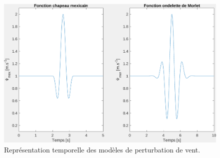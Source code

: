 \begin{figure}[ht!]
    \centerline{
    \includegraphics[trim=0cm 0cm 0cm 0cm,clip,width=0.9\columnwidth]{figures/mex_hat_morlet.png}}
    \caption{Représentation temporelle des modèles de perturbation de vent.}
    \label{fig:mexhat}
\end{figure}





